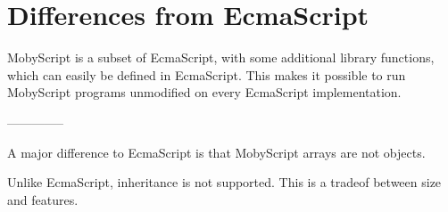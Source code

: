 \section{Differences from EcmaScript}

MobyScript is a subset of EcmaScript, with some additional library functions, which can easily be defined in EcmaScript. This makes it possible to run MobyScript programs unmodified on every EcmaScript implementation.

--------------

A major difference to EcmaScript is that MobyScript arrays are not objects.

Unlike EcmaScript, inheritance is not supported. This is a tradeof between size and features.
